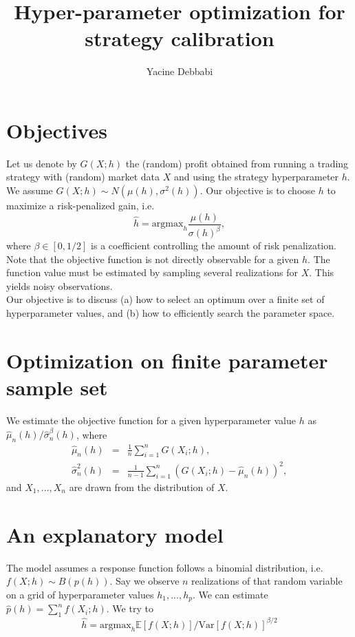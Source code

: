\documentclass[]{article}
\title{\textbf{Hyper-parameter optimization for strategy calibration}}
\author{Yacine Debbabi}
\begin{document}
\maketitle

\tableofcontents

\section{Objectives}
Let us denote by $G(X;h)$ the (random) profit obtained from running a trading strategy with (random) market data $X$ and using the strategy hyperparameter $h$. We assume $G(X;h)\sim N(\mu(h),\sigma^2(h))$. Our objective is to choose $h$ to maximize a risk-penalized gain, i.e.
\begin{equation}
\hat{h}=\mathrm{argmax}_h \frac{\mu(h)}{\sigma(h)^\beta},
\end{equation}
where $\beta\in [0,1/2]$ is a coefficient controlling the amount of risk penalization. Note that the objective function is not directly observable for a given $h$. The function value must be estimated by sampling several realizations for $X$. This yields noisy observations.\\ 

Our objective is to discuss (a) how to select an optimum over a finite set of hyperparameter values, and (b) how to efficiently search the parameter space. 

\section{Optimization on finite parameter sample set}

We estimate the objective function for a given hyperparameter value $h$ as $\hat{\mu}_n(h)/\hat{\sigma}_n^\beta(h)$, where
\begin{eqnarray}
\hat{\mu}_n(h) &=& \frac{1}{n}\sum_{i=1}^n G(X_i;h),\\
\hat{\sigma}_n^2(h) &=& \frac{1}{n-1}\sum_{i=1}^n (G(X_i;h)-\hat{\mu}_n(h))^2,
\end{eqnarray}
and $X_1,...,X_n$ are drawn from the distribution of $X$.


\section{An explanatory model}

The model assumes a response function follows a binomial distribution, i.e. $f(X;h)\sim B(p(h))$. Say we observe $n$ realizations of that random variable on a grid of hyperparameter values $h_1,...,h_p$. We can estimate $\hat{p}(h)=\sum_1^{n} f(X_i;h)$. We try to
\begin{equation}
\hat{h}=\mathrm{argmax}_h \mathbb{E}\left[f(X;h)\right]/\mathrm{Var}\left[f(X;h)\right]^{\beta/2}
\end{equation}
\end{document}
